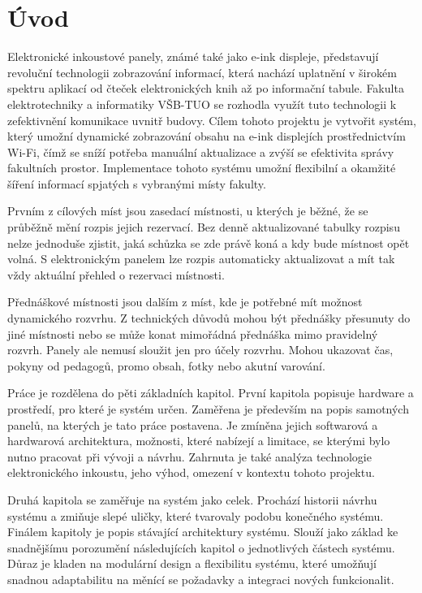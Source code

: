 \chapter{Úvod}

Elektronické inkoustové panely, známé také jako e-ink displeje, představují revoluční technologii zobrazování informací, která nachází uplatnění v širokém spektru aplikací od čteček elektronických knih až po informační tabule. Fakulta elektrotechniky a informatiky VŠB-TUO se rozhodla využít tuto technologii k zefektivnění komunikace uvnitř budovy. Cílem tohoto projektu je vytvořit systém, který umožní dynamické zobrazování obsahu na e-ink displejích prostřednictvím Wi-Fi, čímž se sníží potřeba manuální aktualizace a zvýší se efektivita správy fakultních prostor. Implementace tohoto systému umožní flexibilní a okamžité šíření informací spjatých s vybranými místy fakulty.

Prvním z cílových míst jsou zasedací místnosti, u kterých je běžné, že se průběžně mění rozpis jejich rezervací. Bez denně aktualizované tabulky rozpisu nelze jednoduše zjistit, jaká schůzka se zde právě koná a kdy bude místnost opět volná. S elektronickým panelem lze rozpis automaticky aktualizovat a mít tak vždy aktuální přehled o rezervaci místnosti.

Přednáškové místnosti jsou dalším z míst, kde je potřebné mít možnost dynamického rozvrhu. Z technických důvodů mohou být přednášky přesunuty do jiné místnosti nebo se může konat mimořádná přednáška mimo pravidelný rozvrh. Panely ale nemusí sloužit jen pro účely rozvrhu. Mohou ukazovat čas, pokyny od pedagogů, promo obsah, fotky nebo akutní varování.

Práce je rozdělena do pěti základních kapitol. První kapitola popisuje hardware a prostředí, pro které je systém určen. Zaměřena je především na popis samotných panelů, na kterých je tato práce postavena. Je zmíněna jejich softwarová a hardwarová architektura, možnosti, které nabízejí a limitace, se kterými bylo nutno pracovat při vývoji a návrhu. Zahrnuta je také analýza technologie elektronického inkoustu, jeho výhod, omezení v kontextu tohoto projektu.

Druhá kapitola se zaměřuje na systém jako celek. Prochází historii návrhu systému a zmiňuje slepé uličky, které tvarovaly podobu konečného systému. Finálem kapitoly je popis stávající architektury systému. Slouží jako základ ke snadnějšímu porozumění následujících kapitol o jednotlivých částech systému. Důraz je kladen na modulární design a flexibilitu systému, které umožňují snadnou adaptabilitu na měnící se požadavky a integraci nových funkcionalit.

